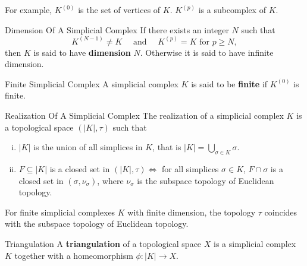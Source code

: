 \documentclass{report}
\begin{document}
For example, $K^{(0)}$ is the set of vertices of $K$. $K^{(p)}$ is a subcomplex of $K$.

\begin{definition}{Dimension Of A Simplicial Complex}{}
If there exists an integer $N$ such that
$$
K^{(N-1)} \neq K \quad \text { and } \quad K^{(p)}=K \text { for }p\ge N ,
$$
then $K$ is said to have \textbf{dimension} $N$. Otherwise it is said to have infinite dimension.
\end{definition}

\begin{definition}{Finite Simplicial Complex}{}
A simplicial complex $K$ is said to be \textbf{finite} if $K^{(0)}$ is finite.
\end{definition}


\begin{definition}{Realization Of A Simplicial Complex}{}
The realization of a simplicial complex $K$ is a topological space $(|K|, \tau)$ such that
\begin{enumerate}[(i)] 
	\item $|K|$ is the union of all simplices in $K$, that is $|K|=\bigcup_{\sigma\in K}\sigma$.
	\item $F\subseteq |K|$ is a closed set in $(|K|, \tau)\iff$ for all simplices $\sigma\in K$, $F\cap \sigma$ is a closed set in $(\sigma,\nu_\sigma)$, where $\nu_\sigma$ is the subspace topology of Euclidean topology.
\end{enumerate}
\end{definition}

For finite simplicial complexes $K$ with finite dimension, the topology $\tau$ coincides with the subspace topology of Euclidean topology. 
\begin{definition}{Triangulation}{}
	A \textbf{triangulation} of a topological space $X$ is a simplicial complex $K$ together with a homeomorphism $\phi:|K|\to X$.
\end{definition}
\end{document}
